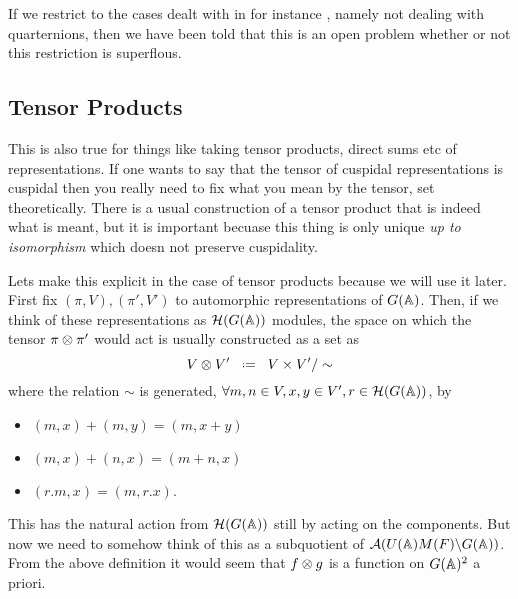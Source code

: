 If we restrict to the cases dealt with in for instance \cite{moeglinSpectralDecompositionEisenstein1995}, namely not dealing with quarternions, then we have been told that this is an open problem whether or not this restriction is superflous. 

\subsection{Tensor Products}
This is also true for things like taking tensor products, direct sums etc of representations. If one wants to say that the tensor of cuspidal representations is cuspidal then you really need to fix what you mean by the tensor, set theoretically. There is a usual construction of a tensor product that is indeed what is meant, but it is important becuase this thing is only unique \textit{up to isomorphism} which doesn not preserve cuspidality.

Lets make this explicit in the case of tensor products because we will use it later. First fix \((\pi, V), (\pi', V')\) to automorphic representations of \(G(\A)\). Then, if we think of these representations as \(\mathcal{H}(G(\A))\) modules, the space on which the tensor \(\pi\otimes \pi'\) would act is usually constructed as a set as 
\[V\tensor V' \defeq V\times V' / \sim\]
where the relation \(\sim\) is generated, \(\forall m,n\in V, x,y\in V', r\in \mathcal{H}(G(\A)) \), by
\begin{itemize}
    \item \((m,x) + (m,y) = (m,x+y)\)
    \item \((m,x) + (n,x) = (m+n,x)\)
    \item \((r.m, x) = (m,r.x)\).
\end{itemize}
This has the natural action from \(\mathcal{H}(G(\A))\) still by acting on the components. But now we need to somehow think of this as a subquotient of \(\mathcal{A}(U(\A)M(F) \backslash G(\A))\). From the above definition it would seem that \(f\otimes g\) is a function on \(G(\A)^2\) a priori. 
